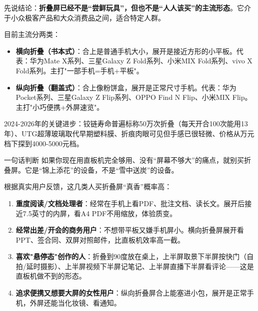 


先说结论：\textbf{折叠屏已经不是“尝鲜玩具”，但也不是“人人该买”的主流形态}。它介于小众极客产品和大众消费品之间，适合特定人群。

目前主流分两类：

\begin{itemize}
  \item \textbf{横向折叠（书本式）}：合上是普通手机大小，展开是接近方形的小平板。代表：华为Mate X系列、三星Galaxy Z Fold系列、小米MIX Fold系列、vivo X Fold系列。主打"一部手机=手机+平板"。
  \item \textbf{纵向折叠（翻盖式）}：合上像粉饼盒，展开是正常尺寸手机。代表：华为Pocket系列、三星Galaxy Z Flip系列、OPPO Find N Flip、小米MIX Flip。主打"小巧便携+外屏速览"。
\end{itemize}

2024-2026年的关键进步：铰链寿命普遍标称50万次折叠（每天开合100次能用13年）、UTG超薄玻璃取代早期塑料膜、折痕肉眼可见但手感已很轻微、价格从万元档下探到4000-5000元档。

\begin{tcbinfo}{一句话判断}
如果你现在用直板机完全够用、没有“屏幕不够大”的痛点，就别买折叠屏。它是“锦上添花”的设备，不是“雪中送炭”的设备。

\end{tcbinfo}


根据真实用户反馈，这几类人买折叠屏“真香”概率高：

\begin{enumerate}
  \item \textbf{重度阅读/文档处理者}：经常在手机上看PDF、批注文档、读长文。展开后接近7.5英寸的内屏，看A4 PDF不用缩放，体验质变。
  \item \textbf{经常出差/开会的商务用户}：不想带平板又嫌手机屏小。横向折叠屏展开看PPT、签合同、双屏对照邮件，比直板机效率高一截。
  \item \textbf{喜欢"悬停态"创作的人}：折叠到90度放在桌上，上半屏取景下半屏按快门（自拍/延时摄影）、上半屏视频下半屏记笔记、上半屏直播下半屏看评论——这是直板机做不到的形态。
  \item \textbf{追求便携又想要大屏的女性用户}：纵向折叠屏合上能塞进小包，展开是正常手机，外屏还能当化妆镜、看通知。
\end{enumerate}

